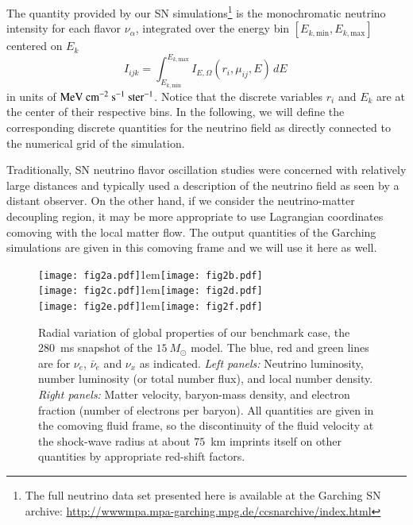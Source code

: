 \documentclass[iop,twocolappendix,numberedappendix]{emulateapj}
\begin{document}
The quantity provided by our SN simulations\footnote{The full neutrino data
set presented here is available at the Garching SN archive:
\href{http://wwwmpa.mpa-garching.mpg.de/ccsnarchive/index.html}
{http://wwwmpa.mpa-garching.mpg.de/ccsnarchive/index.html}} is the
monochromatic neutrino intensity for each flavor $\nu_\alpha$, integrated
over the energy bin $[E_{k,\mathrm{min}},E_{k,\mathrm{max}}]$ centered on $E_k$
\begin{equation}
I_{ijk}=\int_{E_{k,\mathrm{min}}}^{E_{k,\mathrm{max}}}I_{E,\Omega}(r_{i},\mu_{ij},E)\, dE\,
\label{eq:monoint}
\end{equation}
in units of ${\rm MeV}~{\rm cm}^{-2}~{\rm s}^{-1}~{\rm ster}^{-1}$.
 Notice that the discrete variables $r_i$ and $E_k$
are at the center of their respective bins. In the following, we will
define the corresponding discrete quantities for the neutrino field as
directly connected to the numerical grid of the simulation.

Traditionally, SN neutrino flavor oscillation studies were concerned with
relatively large distances and typically used a description of the neutrino
field as seen by a distant observer. On the other hand, if we consider the
neutrino-matter
decoupling region, it may be more appropriate to use Lagrangian coordinates
comoving with the local matter flow. The output quantities of the Garching
simulations are given in this comoving frame and we will use it here as well.

\begin{figure*}
\begin{center}
\texttt{[image: fig2a.pdf]}\kern1em\texttt{[image: fig2b.pdf]}\\
\texttt{[image: fig2c.pdf]}\kern1em\texttt{[image: fig2d.pdf]}\\
\hspace{1mm}\texttt{[image: fig2e.pdf]}\kern1em\texttt{[image: fig2f.pdf]}
%
\caption{Radial variation of global properties of our benchmark case,
the 280~ms snapshot of the $15\ M_\odot$ model.
The blue, red and green lines are for $\nu_e$, $\bar{\nu}_e$ and $\nu_x$ as
indicated. {\em Left panels:} Neutrino luminosity, number luminosity (or
total number flux), and local number density. {\em Right panels:} Matter
velocity, baryon-mass density, and electron fraction (number of electrons
per baryon).
All quantities are given in the comoving fluid frame, so
the discontinuity of the fluid velocity at the shock-wave radius at about
$75$~km imprints itself on other quantities by appropriate red-shift factors.}
 \label{fig:radial_evolution15}
\end{center}
\end{figure*}
\end{document}

